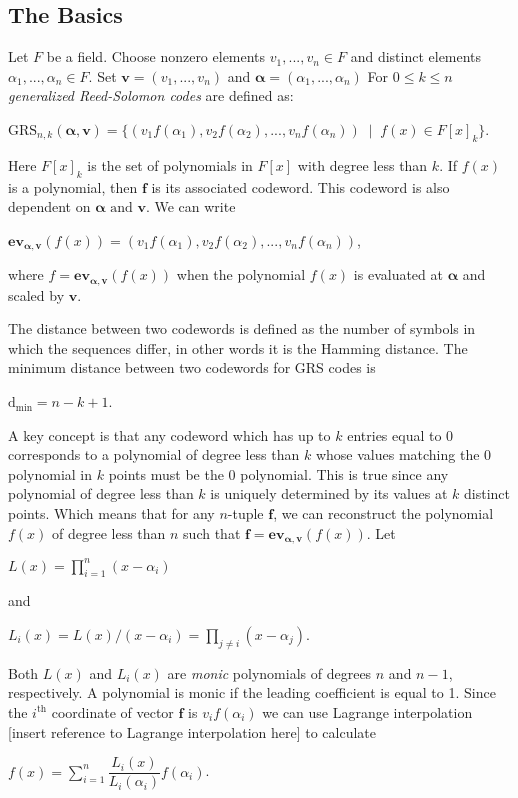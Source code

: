 \documentclass{article}
\begin{document}
\subsection{The Basics}
Let $F$ be a field. Choose nonzero elements $v_{1},..., v_{n} \in F$ and distinct elements $\alpha_{1},...,\alpha_{n} \in F$. Set $\textbf{v} = (v_{1},..., v_{n})$ and $\boldsymbol\alpha = (\alpha_{1},...,\alpha_{n})$ For $0 \le k \le n$ \textit{generalized Reed-Solomon codes} are defined as:
\begin{center}
$\text{GRS}_{n,k}(\boldsymbol\alpha, \textbf{v}) = \{(v_{1}f(\alpha_{1}),v_{2}f(\alpha_{2}),...,v_{n}f(\alpha_{n}))\;\mid\;f(x) \in F[x]_{k}\}$.
\end{center}
Here $F[x]_{k}$ is the set of polynomials in $F[x]$ with degree less than $k$. If $f(x)$ is a polynomial, then $\textbf{f}$ is its associated codeword. This codeword is also dependent on $\boldsymbol\alpha \text{ and } \textbf{v}$. We can write

\begin{center}
$\textbf{ev}_{\boldsymbol\alpha,\textbf{v}}(f(x)) = (v_{1}f(\alpha_{1}),v_{2}f(\alpha_{2}),...,v_{n}f(\alpha_{n}))$,
\end{center}
where $f = \textbf{ev}_{\boldsymbol\alpha,\textbf{v}}(f(x))$ when the polynomial $f(x)$ is evaluated at $\boldsymbol\alpha$ and scaled by $\textbf{v}$.

The distance between two codewords is defined as the number of symbols in which the sequences differ, in other words it is the Hamming distance. The minimum distance between two codewords for GRS codes is

\begin{center}
$\text{d}_{\text{min}} = n - k + 1$.
\end{center}

A key concept is that any codeword which has up to $k$ entries equal to 0 corresponds to a polynomial of degree less than $k$ whose values matching the 0 polynomial in $k$ points must be the 0 polynomial. This is true since any polynomial of degree less than $k$ is uniquely determined by its values at $k$ distinct points. Which means that for any $n$-tuple $\textbf{f}$, we can reconstruct the polynomial $f(x)$ of degree less than $n$ such that $\textbf{f} = \textbf{ev}_{\boldsymbol\alpha,\textbf{v}}(f(x))$. Let

\begin{center}
$L(x) = \prod\limits_{i=1}^{n} (x - \alpha_{i})$
\end{center}
and
\begin{center}
$L_{i}(x) = L(x)/(x - \alpha_{i}) = \prod\limits_{j \neq i} (x - \alpha_{j})$.
\end{center}
Both $L(x)$ and $L_{i}(x)$ are \textit{monic} polynomials of degrees $n$ and $n - 1$, respectively. A polynomial is monic if the leading coefficient is equal to 1. Since the $i^{\text{th}}$ coordinate of vector $\textbf{f}$ is $v_{i}f(\alpha_{i})$ we can use Lagrange interpolation [insert reference to Lagrange interpolation here] to calculate
\begin{center}
$f(x) = \sum\limits_{i=1}^{n} \dfrac{L_{i}(x)}{L_{i}(\alpha_{i})}f(\alpha_{i})$.
\end{center}
\end{document}
